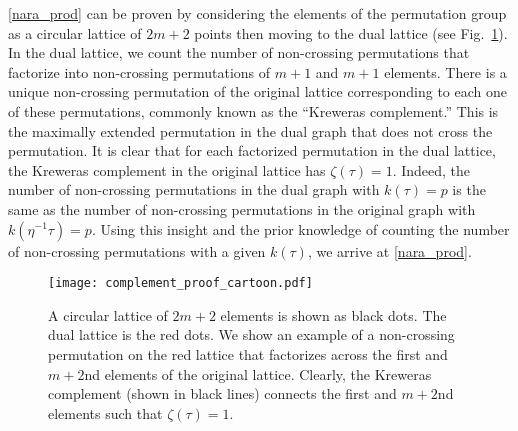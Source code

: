 \documentclass[a4paper,11pt]{article}
\begin{document}
\begin{enumerate}
\eqref{nara_prod} can be proven by considering the elements of the permutation group as a circular lattice of $2m + 2$ points then moving to the dual lattice (see Fig.~\ref{complement_proof}). In the dual lattice, we count the number of non-crossing permutations that factorize into non-crossing permutations of $m + 1$ and $m+ 1$ elements. There is a unique non-crossing permutation of the original lattice corresponding to each one of these permutations, commonly known as the ``Kreweras complement.'' This is the maximally extended permutation in the dual graph that does not cross the permutation. It is clear that for each factorized permutation in the dual lattice, the Kreweras complement in the original lattice has $\zeta(\tau) = 1$. Indeed, the number of non-crossing permutations in the dual graph with $k(\tau) = p$ is the same as the number of non-crossing permutations in the original graph with $k(\eta^{-1}\tau) = p$. Using this insight and the prior knowledge of counting the number of non-crossing permutations with a given $k(\tau)$, we arrive at \eqref{nara_prod}.
\begin{figure}
\centering
\texttt{[image: complement\_proof\_cartoon.pdf]}
\caption{A circular lattice of $2m + 2$ elements is shown as black dots. The dual lattice is the red dots. We show an example of a non-crossing permutation on the red lattice that factorizes across the first and $m + 2$nd elements of the original lattice. Clearly, the Kreweras complement (shown in black lines) connects the first and $m + 2$nd elements such that $\zeta(\tau) = 1$. }
\label{complement_proof}
\end{figure}



\end{enumerate}
\end{document}
